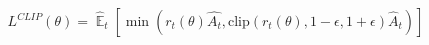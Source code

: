 \documentclass[preview]{standalone}
\begin{document}
\begin{align*}
L^{CLIP}(\theta)=\hat{\mathop{\mathbb{E}}}_t \left[\min(r_t(\theta)\hat{A_t}, \text{clip}(r_t(\theta), 1-\epsilon, 1+\epsilon)\hat{A}_t)\right]
\end{align*}
\end{document}
